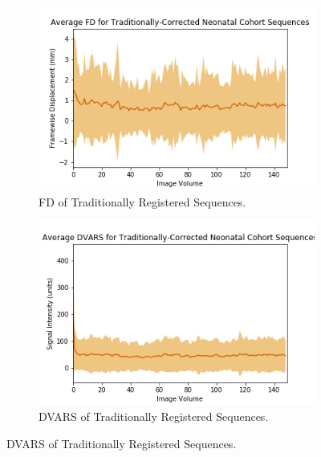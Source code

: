 \begin{figure}[t]
	\begin{subfigure}{0.4\textwidth}
		\centering
		\includegraphics[width=1.0\textwidth]{6/figures/neonates-trad-fd-150.png}
		\caption{FD of Traditionally Registered Sequences.}
	\end{subfigure}
	\hspace{0.05\textwidth}
	\begin{subfigure}{0.4\textwidth}
		\centering
		\includegraphics[width=1.0\textwidth]{6/figures/neonates-trad-dvars-150.png}
		\caption{DVARS of Traditionally Registered Sequences.}
	\end{subfigure}
	

\end{figure}
